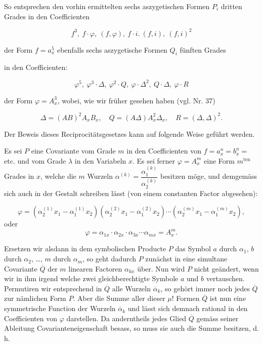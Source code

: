 So entsprechen den vorhin ermittelten sechs aszygetischen Formen $P_i$ dritten Grades in den Coefficienten

\[
f^3,\ f\cdot\varphi,\ (f,\varphi),\ f\cdot i.\ (f,i),\ (f,i)^2
\]

der Form $f=a_x^5$ ebenfalls sechs aszygetische Formen $Q_i$ fünften Grades


in den Coefficienten:

\[
\varphi^5,\ \varphi^3\cdot\Delta,\ \varphi^2\cdot Q,\ \varphi\cdot\Delta^2,\ Q\cdot\Delta,\ \varphi\cdot R
\]

der Form $\varphi=A_x^3$, wobei, wie wir früher gesehen haben (vgl. Nr. 37)

\[
\Delta=(AB)^2A_xB_x,\quad Q=(A\Delta)A_x^2\Delta_x,\quad R=(\Delta,\Delta)^2.
\]

Der Beweis dieses Reciprocitätsgesetzes kann auf folgende Weise geführt werden.

Es sei $P$ eine Covariante vom Grade $m$ in den Coefficienten von $f=a_x^n=b_x^n=$ etc. und vom Grade $\lambda$ in den Variabeln $x$. Es sei ferner $\varphi=A_x^m$ eine Form $m^{\mathrm{ten}}$ Grades in $x$, welche die $m$ Wurzeln $\alpha^{(k)}=\dfrac{\alpha_1^{(k)}}{\alpha_2^{(k)}}$ besitzen möge, und demgemäss sich auch in der Gestalt schreiben lässt (von einem constanten Factor abgesehen):

\[
\varphi=(\alpha_2^{(1)}x_1-\alpha_1^{(1)}x_2)(\alpha_2^{(2)}x_1-\alpha_1^{(2)}x_2)\cdots(\alpha_2^{(m)}x_1-\alpha_1^{(m)}x_2),
\]
oder
\[
\varphi=\alpha_{1x}\cdot\alpha_{2x}\cdot\alpha_{3x}\cdots\alpha_{mx}=A_x^m.
\]

Ersetzen wir alsdann in dem symbolischen Producte $P$ das Symbol $a$ durch $\alpha_1$, $b$ durch $\alpha_2$, \dots, $m$ durch $\alpha_m$, so geht dadurch $P$ zunächst in eine simultane Covariante $\overline{Q}$ der $m$ linearen Factoren $\alpha_{kx}$ über. Nun wird $P$ nicht geändert, wenn wir in ihm irgend welche zwei gleichberechtigte Symbole $a$ und $b$ vertauschen. Permutiren wir entsprechend in $\overline{Q}$ alle Wurzeln $\overline{\alpha}_k$, so gehört immer noch jedes $\overline{Q}$ zur nämlichen Form $P$. Aber die Summe aller dieser $\mu!$ Formen $\overline{Q}$ ist nun eine symmetrische Function der Wurzeln $\overline{\alpha}_k$ und lässt sich demnach rational in den Coefficienten von $\varphi$ darstellen. Da anderntheils jedes Glied $\overline{Q}$ gemäss seiner Ableitung Covarianteneigenschaft besass, so muss sie auch die Summe besitzen, d. h.

